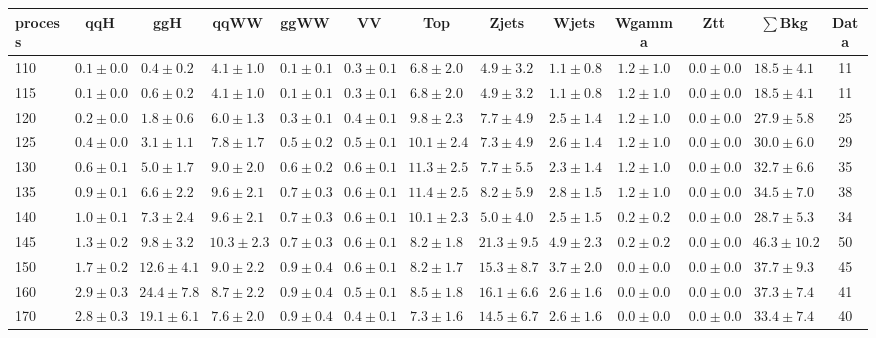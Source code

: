 \begin{table}
{%
 \tiny
 \begin{center}
 \begin{tabular}{l | c c | c c c c c c c c  | c c}
 \hline
 process & qqH & ggH & qqWW & ggWW & VV & Top & Zjets & Wjets & Wgamma & Ztt & $\sum$Bkg & Data \\
 \hline
110 & $0.1\pm0.0$ & $0.4\pm0.2$ & $4.1\pm1.0$ & $0.1\pm0.1$ & $0.3\pm0.1$ & $6.8\pm2.0$ & $4.9\pm3.2$ & $1.1\pm0.8$ & $1.2\pm1.0$ & $0.0\pm0.0$ & $18.5\pm4.1$ & 11 \\
115 & $0.1\pm0.0$ & $0.6\pm0.2$ & $4.1\pm1.0$ & $0.1\pm0.1$ & $0.3\pm0.1$ & $6.8\pm2.0$ & $4.9\pm3.2$ & $1.1\pm0.8$ & $1.2\pm1.0$ & $0.0\pm0.0$ & $18.5\pm4.1$ & 11 \\
120 & $0.2\pm0.0$ & $1.8\pm0.6$ & $6.0\pm1.3$ & $0.3\pm0.1$ & $0.4\pm0.1$ & $9.8\pm2.3$ & $7.7\pm4.9$ & $2.5\pm1.4$ & $1.2\pm1.0$ & $0.0\pm0.0$ & $27.9\pm5.8$ & 25 \\
125 & $0.4\pm0.0$ & $3.1\pm1.1$ & $7.8\pm1.7$ & $0.5\pm0.2$ & $0.5\pm0.1$ & $10.1\pm2.4$ & $7.3\pm4.9$ & $2.6\pm1.4$ & $1.2\pm1.0$ & $0.0\pm0.0$ & $30.0\pm6.0$ & 29 \\
130 & $0.6\pm0.1$ & $5.0\pm1.7$ & $9.0\pm2.0$ & $0.6\pm0.2$ & $0.6\pm0.1$ & $11.3\pm2.5$ & $7.7\pm5.5$ & $2.3\pm1.4$ & $1.2\pm1.0$ & $0.0\pm0.0$ & $32.7\pm6.6$ & 35 \\
135 & $0.9\pm0.1$ & $6.6\pm2.2$ & $9.6\pm2.1$ & $0.7\pm0.3$ & $0.6\pm0.1$ & $11.4\pm2.5$ & $8.2\pm5.9$ & $2.8\pm1.5$ & $1.2\pm1.0$ & $0.0\pm0.0$ & $34.5\pm7.0$ & 38 \\
140 & $1.0\pm0.1$ & $7.3\pm2.4$ & $9.6\pm2.1$ & $0.7\pm0.3$ & $0.6\pm0.1$ & $10.1\pm2.3$ & $5.0\pm4.0$ & $2.5\pm1.5$ & $0.2\pm0.2$ & $0.0\pm0.0$ & $28.7\pm5.3$ & 34 \\
145 & $1.3\pm0.2$ & $9.8\pm3.2$ & $10.3\pm2.3$ & $0.7\pm0.3$ & $0.6\pm0.1$ & $8.2\pm1.8$ & $21.3\pm9.5$ & $4.9\pm2.3$ & $0.2\pm0.2$ & $0.0\pm0.0$ & $46.3\pm10.2$ & 50 \\
150 & $1.7\pm0.2$ & $12.6\pm4.1$ & $9.0\pm2.2$ & $0.9\pm0.4$ & $0.6\pm0.1$ & $8.2\pm1.7$ & $15.3\pm8.7$ & $3.7\pm2.0$ & $0.0\pm0.0$ & $0.0\pm0.0$ & $37.7\pm9.3$ & 45 \\
160 & $2.9\pm0.3$ & $24.4\pm7.8$ & $8.7\pm2.2$ & $0.9\pm0.4$ & $0.5\pm0.1$ & $8.5\pm1.8$ & $16.1\pm6.6$ & $2.6\pm1.6$ & $0.0\pm0.0$ & $0.0\pm0.0$ & $37.3\pm7.4$ & 41 \\
170 & $2.8\pm0.3$ & $19.1\pm6.1$ & $7.6\pm2.0$ & $0.9\pm0.4$ & $0.4\pm0.1$ & $7.3\pm1.6$ & $14.5\pm6.7$ & $2.6\pm1.6$ & $0.0\pm0.0$ & $0.0\pm0.0$ & $33.4\pm7.4$ & 40 \\

\end{tabular}
\end{center}}
\end{table}
